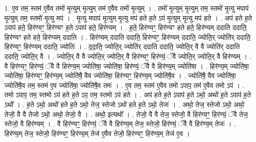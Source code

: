 \documentclass[17pt]{extarticle}
\begin{document}
1. ए॒व तम॒ स्तम॑ ए॒वैव तमो॑ मृ॒त्युम् मृ॒त्युम् तम॑ ए॒वैव तमो॑ मृ॒त्युम् । . तमो॑ मृ॒त्युम् मृ॒त्युम् तम॒ स्तमो॑ मृ॒त्यु मपाप॑ मृ॒त्युम् तम॒ स्तमो॑ मृ॒त्यु मप॑ । . मृ॒त्यु मपाप॑ मृ॒त्युम् मृ॒त्यु मप॑ हते ह॒ते ऽप॑ मृ॒त्युम् मृ॒त्यु मप॑ हते । . अप॑ हते ह॒ते ऽपाप॑ हते॒ हिर॑ण्यꣳ॒॒ हिर॑ण्यꣳ ह॒ते ऽपाप॑ हते॒ हिर॑ण्यम् । . ह॒ते॒ हिर॑ण्यꣳ॒॒ हिर॑ण्यꣳ हते हते॒ हिर॑ण्यम् ददाति ददाति॒ हिर॑ण्यꣳ हते हते॒ हिर॑ण्यम् ददाति । . हिर॑ण्यम् ददाति ददाति॒ हिर॑ण्यꣳ॒॒ हिर॑ण्यम् ददाति॒ ज्योति॒र् ज्योति॑र् ददाति॒ हिर॑ण्यꣳ॒॒ हिर॑ण्यम् ददाति॒ ज्योतिः॑ । . द॒दा॒ति॒ ज्योति॒र् ज्योति॑र् ददाति ददाति॒ ज्योति॒र् वै वै ज्योति॑र् ददाति ददाति॒ ज्योति॒र् वै । . ज्योति॒र् वै वै ज्योति॒र् ज्योति॒र् वै हिर॑ण्यꣳ॒॒ हिर॑ण्यं॒ ॅवै ज्योति॒र् ज्योति॒र् वै हिर॑ण्यम् । . वै हिर॑ण्यꣳ॒॒ हिर॑ण्यं॒ ॅवै वै हिर॑ण्य॒म् ज्योति॑षा॒ ज्योति॑षा॒ हिर॑ण्यं॒ ॅवै वै हिर॑ण्य॒म् ज्योति॑षा । . हिर॑ण्य॒म् ज्योति॑षा॒ ज्योति॑षा॒ हिर॑ण्यꣳ॒॒ हिर॑ण्य॒म् ज्योति॑षै॒ वैव ज्योति॑षा॒ हिर॑ण्यꣳ॒॒ हिर॑ण्य॒म् ज्योति॑षै॒व । . ज्योति॑षै॒ वैव ज्योति॑षा॒ ज्योति॑षै॒व तम॒ स्तम॑ ए॒व ज्योति॑षा॒ ज्योति॑षै॒व तमः॑ । . ए॒व तम॒ स्तम॑ ए॒वैव तमो ऽपाप॒ तम॑ ए॒वैव तमो ऽप॑ । . तमो ऽपाप॒ तम॒ स्तमो ऽप॑ हते ह॒ते ऽप॒ तम॒ स्तमो ऽप॑ हते । . अप॑ हते ह॒ते ऽपाप॑ ह॒ते ऽथो॒ अथो॑ ह॒ते ऽपाप॑ ह॒ते ऽथो᳚ । . ह॒ते ऽथो॒ अथो॑ हते ह॒ते ऽथो॒ तेज॒ स्तेजो ऽथो॑ हते ह॒ते ऽथो॒ तेजः॑ । . अथो॒ तेज॒ स्तेजो ऽथो॒ अथो॒ तेजो॒ वै वै तेजो ऽथो॒ अथो॒ तेजो॒ वै । . अथो॒ इत्यथो᳚ । . तेजो॒ वै वै तेज॒ स्तेजो॒ वै हिर॑ण्यꣳ॒॒ हिर॑ण्यं॒ ॅवै तेज॒ स्तेजो॒ वै हिर॑ण्यम् । . वै हिर॑ण्यꣳ॒॒ हिर॑ण्यं॒ ॅवै वै हिर॑ण्य॒म् तेज॒ स्तेजो॒ हिर॑ण्यं॒ ॅवै वै हिर॑ण्य॒म् तेजः॑ । . हिर॑ण्य॒म् तेज॒ स्तेजो॒ हिर॑ण्यꣳ॒॒ हिर॑ण्य॒म् तेज॑ ए॒वैव तेजो॒ हिर॑ण्यꣳ॒॒ हिर॑ण्य॒म् तेज॑ ए॒व । \newline
\end{document}
